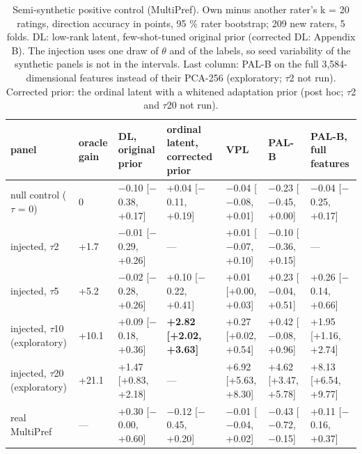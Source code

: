 \documentclass{article}
\begin{document}
\begin{table}[t]\centering\caption{Semi-synthetic positive control (MultiPref). Own minus another rater's k = 20 ratings, direction accuracy in points, 95 \% rater bootstrap; 209 new raters, 5 folds. DL: low-rank latent, few-shot-tuned original prior (corrected DL: Appendix B). The injection uses one draw of $\theta$ and of the labels, so seed variability of the synthetic panels is not in the intervals. Last column: PAL-B on the full 3,584-dimensional features instead of their PCA-256 (exploratory; $\tau$2 not run). Corrected prior: the ordinal latent with a whitened adaptation prior (post hoc; $\tau$2 and $\tau$20 not run).}\scriptsize\setlength{\tabcolsep}{3pt}\begin{tabular}{@{}
  l
  l
  l
  l
  l
  l
  l@{}}
\toprule\noalign{}
panel & oracle gain & DL, original prior & ordinal latent, corrected prior & VPL & PAL-B & PAL-B, full features \\
\midrule\noalign{}



null control ($\tau$ = 0) & 0 & $-$0.10 {[}$-$0.38, +0.17{]} & +0.04 {[}$-$0.11, +0.19{]} & $-$0.04 {[}$-$0.08, +0.01{]} & $-$0.23 {[}$-$0.45, +0.00{]} & $-$0.04 {[}$-$0.25, +0.17{]} \\
injected, $\tau$2 & +1.7 & $-$0.01 {[}$-$0.29, +0.26{]} & --- & +0.01 {[}$-$0.07, +0.10{]} & $-$0.10 {[}$-$0.36, +0.15{]} & --- \\
injected, $\tau$5 & +5.2 & $-$0.02 {[}$-$0.28, +0.26{]} & +0.10 {[}$-$0.22, +0.41{]} & +0.01 {[}+0.00, +0.03{]} & +0.23 {[}$-$0.04, +0.51{]} & +0.26 {[}$-$0.14, +0.66{]} \\
injected, $\tau$10 (exploratory) & +10.1 & +0.09 {[}$-$0.18, +0.36{]} & \textbf{+2.82 {[}+2.02, +3.63{]}} & +0.27 {[}+0.02, +0.54{]} & +0.42 {[}$-$0.08, +0.96{]} & +1.95 {[}+1.16, +2.74{]} \\
injected, $\tau$20 (exploratory) & +21.1 & +1.47 {[}+0.83, +2.18{]} & --- & +6.92 {[}+5.63, +8.30{]} & +4.62 {[}+3.47, +5.78{]} & +8.13 {[}+6.54, +9.77{]} \\
real MultiPref & --- & +0.30 {[}$-$0.00, +0.60{]} & $-$0.12 {[}$-$0.45, +0.20{]} & $-$0.01 {[}$-$0.04, +0.02{]} & $-$0.43 {[}$-$0.72, $-$0.15{]} & +0.11 {[}$-$0.16, +0.37{]} \\
\bottomrule
\end{tabular}\end{table}
\end{document}
